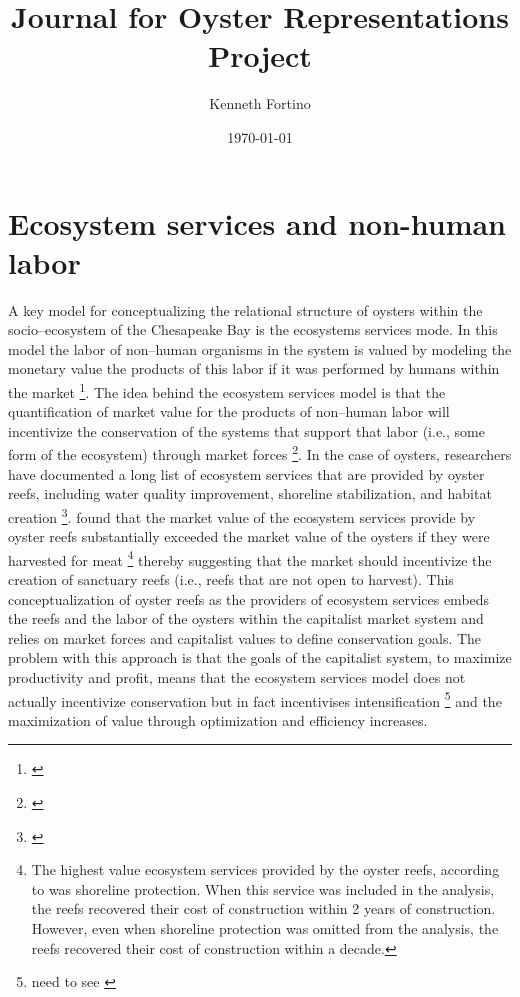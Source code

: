 \documentclass{article}
\begin{document}
\title{Journal for Oyster Representations Project}
\author{Kenneth Fortino}
\date{\today}

\maketitle

\section{Ecosystem services and non-human labor}

A key model for conceptualizing the relational structure of oysters within the socio--ecosystem of the Chesapeake Bay is the ecosystems services mode. In this model the labor of non--human organisms in the system is valued by modeling the monetary value the products of this labor if it was performed by humans within the market \footnote{\cite{ecosystem_serv}}. The idea behind the ecosystem services model is that the quantification of market value for the products of non--human labor will incentivize the conservation of the systems that support that labor (i.e., some form of the ecosystem) through market forces \footnote{\cite{ecosystem_serv}}. In the case of oysters, researchers have documented a long list of ecosystem services that are provided by oyster reefs, including water quality improvement, shoreline stabilization, and habitat creation \footnote{\cite{grabowski_economic_2012}}. \cite{grabowski_economic_2012} found that the market value of the ecosystem services provide by oyster reefs substantially exceeded the market value of the oysters if they were harvested for meat \footnote{The highest value ecosystem services  provided by the oyster reefs, according to \cite{grabowski_economic_2012} was shoreline protection. When this service was included in the analysis, the reefs recovered their cost of construction within 2 years of construction. However, even when shoreline protection was omitted from the analysis, the reefs recovered their cost of construction within a decade.} thereby suggesting that the market should incentivize the creation of sanctuary reefs (i.e., reefs that are not open to harvest). This conceptualization of oyster reefs as the providers of ecosystem services embeds the reefs and the labor of the oysters within the capitalist market system and relies on market forces and capitalist values to define conservation goals. The problem with this approach is that the goals of the capitalist system, to maximize productivity and profit, means that the ecosystem services model does not actually incentivize conservation but in fact incentivises intensification \footnote{need to see \cite{bommarco_ecological_2013}} and the maximization of value through optimization and efficiency increases. 
\end{document}
